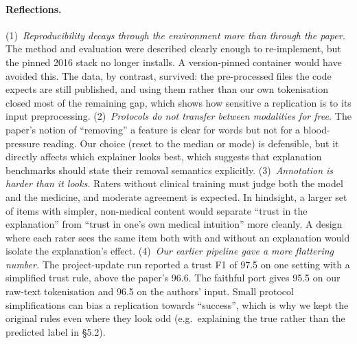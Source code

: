 \paragraph{Reflections.} (1)~\emph{Reproducibility decays through the environment more than through the paper.} The method and evaluation were described clearly enough to re-implement, but the pinned 2016 stack no longer installs. A version-pinned container would have avoided this. The data, by contrast, survived: the pre-processed files the code expects are still published, and using them rather than our own tokenisation closed most of the remaining gap, which shows how sensitive a replication is to its input preprocessing. (2)~\emph{Protocols do not transfer between modalities for free.} The paper's notion of ``removing'' a feature is clear for words but not for a blood-pressure reading. Our choice (reset to the median or mode) is defensible, but it directly affects which explainer looks best, which suggests that explanation benchmarks should state their removal semantics explicitly. (3)~\emph{Annotation is harder than it looks.} Raters without clinical training must judge both the model and the medicine, and moderate agreement is expected. In hindsight, a larger set of items with simpler, non-medical content would separate ``trust in the explanation'' from ``trust in one's own medical intuition'' more cleanly. A design where each rater sees the same item both with and without an explanation would isolate the explanation's effect. (4)~\emph{Our earlier pipeline gave a more flattering number.} The project-update run reported a trust F1 of 97.5 on one setting with a simplified trust rule, above the paper's 96.6. The faithful port gives 95.5 on our raw-text tokenisation and 96.5 on the authors' input. Small protocol simplifications can bias a replication towards ``success'', which is why we kept the original rules even where they look odd (e.g.\ explaining the true rather than the predicted label in \S5.2).
